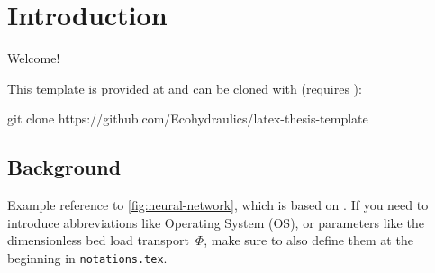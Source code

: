 \chapter{Introduction}
\label{ch:introduction}

\setcounter{page}{1}

Welcome!

This template is provided at  and can be cloned with (requires ):

\begin{terminal}
  git clone https://github.com/Ecohydraulics/latex-thesis-template
\end{terminal}

\section{Background}
\label{subsec:background}

Example reference to \autoref{fig:neural-network}, which is based on \cite{kim2017neural}. If you need to introduce abbreviations like Operating System (OS), or parameters like the dimensionless bed load transport~$\Phi$, make sure to also define them at the beginning in \texttt{notations.tex}.

